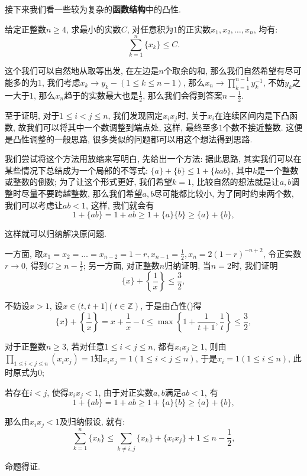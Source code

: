 \documentclass[lang=cn,12pt,thmcnt=section]{elegantbook}
\renewcommand{\note}[1]{({\kaishu\dashuline{#1}})}
\begin{document}
接下来我们看一些较为复杂的\textbf{函数结构}中的凸性.


\begin{example}
给定正整数$n\ge 4$, 求最小的实数$C$, 对任意积为$1$的正实数$x_1,x_2,\dots{},x_n$, 均有: 
\[
\sum_{k=1}^n \{x_k\}\le C.
\]
\end{example}

\begin{analysis}
这个我们可以自然地从取等出发, 在左边是$n$个取余的和, 那么我们自然希望有尽可能多的为$1$, 我们考虑$x_k\to y_k-(1\le k\le n-1)$, 那么$x_n\to \prod_{k=1}^{n-1}y_k^{-1}$, 不妨$y_k$之一大于$1$, 那么$x_n$趋于的实数最大也是$\frac{1}{2}$, 那么我们会得到答案$n-\frac{1}{2}$.

至于证明, 对于$1\le i<j\le n$, 我们发现固定$x_ix_j$时, 关于$x_i$在连续区间内是下凸函数, 故我们可以将其中一个数调整到端点处, 这样, 最终至多$1$个数不接近整数. 这便是{\heiti 凸性调整}的一般思路, 很多类似的问题都可以用这个想法得到思路.

我们尝试将这个方法用放缩来写明白, 先给出一个方法: 据此思路, 其实我们可以在某些情况下总结成为一个局部的不等式: $\{a\}+\{b\}\le 1+\{kab\}$, 其中$k$是一个整数或整数的倒数; 为了让这个形式更好, 我们希望$k=1$, 比较自然的想法就是让$a,b$调整时尽量不要跨越整数, 那么我们希望$a,b$尽可能都比较小, 为了同时约束两个数, 我们可以考虑让$ab<1$, 这样, 我们就会有
\[
1+\{ab\}=1+ab\ge 1+\{a\}\{b\}\ge \{a\}+\{b\},
\]

这样就可以归纳解决原问题.

\end{analysis}

\begin{solution}
一方面, 取$x_1=x_2=\dots{}=x_{n-2}=1-r,x_{n-1}=\frac{1}{2},x_n=2(1-r)^{-n+2}$, 令正实数$r\to 0$, 得到$C\ge n-\frac{1}{2}$; 另一方面, 对正整数$n$归纳证明, 当$n=2$时, 我们证明
\[
\{x\}+\left\{\frac{1}{x}\right\}\le \frac{3}{2},
\]

不妨设$x>1$, 设$x\in (t,t+1](t\in\mathbb{Z})$, 于是由凸性\note{对勾函数的凸性}得
\[
\{x\}+\left\{\frac{1}{x}\right\}=x+\frac{1}{x}-t\le \max\left\{1+\frac{1}{t+1},\frac{1}{t}\right\}\le \frac{3}{2},
\]

对于正整数$n\ge 3$, 若对任意$1\le i<j\le n$, 都有$x_ix_j\ge 1$, 则由$\prod_{1\le i<j\le n}(x_ix_j)=1$知$x_ix_j=1(1\le i<j\le n)$, 于是$x_i=1(1\le i\le n)$, 此时原式为$0$; 

若存在$i<j$, 使得$x_ix_j<1$, 由于对正实数$a,b$满足$ab<1$, 有
\[
1+\{ab\}=1+ab\ge 1+\{a\}\{b\}\ge \{a\}+\{b\},
\]

那么由$x_ix_j<1$及归纳假设, 就有: 
\[
\sum_{k=1}^n \{x_k\}\le \sum_{k\ne i,j} \{x_k\}+\{x_ix_j\}+1\le n-\frac{1}{2},
\]

命题得证.
\end{solution}
\end{document}

